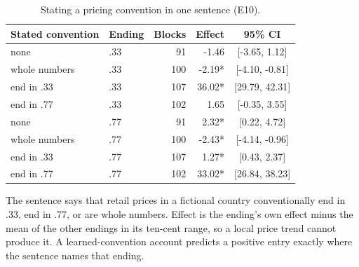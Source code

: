 \begin{table}[t]
\centering
\caption{Stating a pricing convention in one sentence (E10).}
\label{tab:installed}
\small
\begin{tabular}{llrrc}
\toprule
Stated convention & Ending & Blocks & Effect & 95\% CI \\
\midrule
none & .33 &  91 & -1.46 & [-3.65, 1.12] \\
whole numbers & .33 & 100 & -2.19* & [-4.10, -0.81] \\
end in .33 & .33 & 107 & 36.02* & [29.79, 42.31] \\
end in .77 & .33 & 102 & 1.65 & [-0.35, 3.55] \\
none & .77 &  91 & 2.32* & [0.22, 4.72] \\
whole numbers & .77 & 100 & -2.43* & [-4.14, -0.96] \\
end in .33 & .77 & 107 & 1.27* & [0.43, 2.37] \\
end in .77 & .77 & 102 & 33.02* & [26.84, 38.23] \\
\bottomrule
\end{tabular}
\vspace{2pt}
\parbox{\linewidth}{\footnotesize The sentence says that retail prices in a fictional country conventionally end in .33, end in .77, or are whole numbers. Effect is the ending's own effect minus the mean of the other endings in its ten-cent range, so a local price trend cannot produce it. A learned-convention account predicts a positive entry exactly where the sentence names that ending.}
\end{table}
